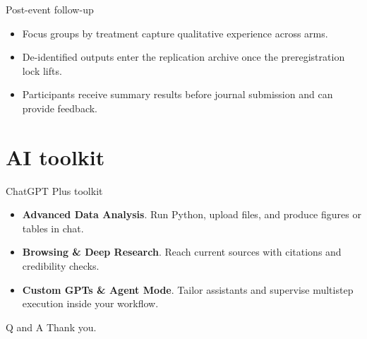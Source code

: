 \documentclass[aspectratio=169,professionalfonts]{beamer}
\newcommand{\feature}[1]{\textbf{#1}}
\begin{document}
\begin{frame}{Post-event follow-up}
  \begin{itemize}
    \item Focus groups by treatment capture qualitative experience across arms.
    \item De-identified outputs enter the replication archive once the preregistration lock lifts.
    \item Participants receive summary results before journal submission and can provide feedback.
  \end{itemize}
\end{frame}

\section{AI toolkit}

\begin{frame}{ChatGPT Plus toolkit}
  \begin{itemize}
    \item \feature{Advanced Data Analysis}. Run Python, upload files, and produce figures or tables in chat.
    \item \feature{Browsing \& Deep Research}. Reach current sources with citations and credibility checks.
    \item \feature{Custom GPTs \& Agent Mode}. Tailor assistants and supervise multistep execution inside your workflow.
  \end{itemize}
\end{frame}

\begin{frame}{Q and A}
  \centering Thank you.
\end{frame}
\end{document}
